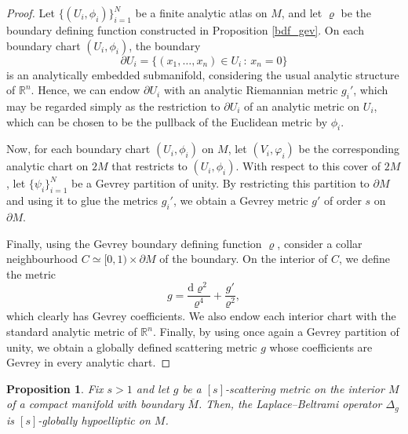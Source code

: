 \documentclass[11pt,reqno]{amsart}
\numberwithin{equation}{section}
\newtheorem{proposition}[theorem]{Proposition}
\begin{document}
	\begin{proof}
		Let $\{(U_i,\phi_i)\}_{i=1}^N$ be a finite analytic atlas on $M$, and let $\varrho$ be the boundary defining function constructed in Proposition \ref{bdf_gev}. On each boundary chart $(U_i,\phi_i)$, the boundary
		\[
		\partial U_i = \{(x_1,\dots,x_n) \in U_i \,:\, x_n = 0\}
		\]
		is an analytically embedded submanifold, considering the usual analytic structure of $\mathbb{R}^n$. Hence, we can endow $\partial U_i$ with an analytic Riemannian metric $g_i'$, which may be regarded simply as the restriction to $\partial U_i$ of an analytic metric on $U_i$, which can be chosen to be the pullback of the Euclidean metric by $\phi_i$.
		
		Now, for each boundary chart $(U_i,\phi_i)$ on $M$, let $(V_i,\varphi_i)$ be the corresponding analytic chart on $2M$ that restricts to $(U_i,\phi_i)$. With respect to this cover of $2M$, let $\{\psi_i\}_{i=1}^N$ be a Gevrey partition of unity. By restricting this partition to $\partial M$ and using it to glue the metrics $g_i'$, we obtain a Gevrey metric $g'$ of order $s$ on $\partial M$.
		
		Finally, using the Gevrey boundary defining function $\varrho$, consider a collar neighbourhood $C \simeq [0,1) \times \partial M$ of the boundary. On the interior of $C$, we define the metric
		\[
		g = \dfrac{\mathrm{d}\varrho^2}{\varrho^4} + \dfrac{g'}{\varrho^2},
		\]
		which clearly has Gevrey coefficients. We also endow each interior chart with the standard analytic metric of $\mathbb{R}^n$. Finally, by using once again a Gevrey partition of unity, we obtain a globally defined scattering metric $g$ whose coefficients are Gevrey in every analytic chart.
	\end{proof}
	
	
	\begin{proposition}\label{gh_lapl}
		Fix $s>1$ and let $g$ be a ${[s]}$-scattering metric on the interior $M$ of a compact manifold with boundary $\overline{M}$. Then, the Laplace--Beltrami operator $\Delta_g$ is ${[s]}$-globally hypoelliptic on $M$.
	\end{proposition}
\end{document}
